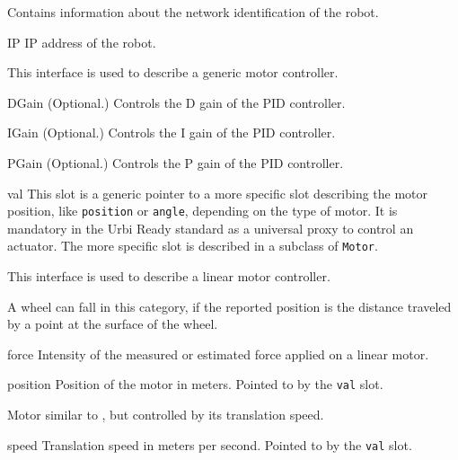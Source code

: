 
Contains information about the network identification of the robot.

\begin{urbiscriptapi}
\item[IP] IP address of the robot.
\end{urbiscriptapi}


This interface is used to describe a generic motor controller.

\begin{urbiscriptapi}
\item[DGain]{} (Optional.) Controls the D gain of the PID controller.


\item[IGain]{} (Optional.) Controls the I gain of the PID controller.


\item[PGain]{} (Optional.) Controls the P gain of the PID controller.


\item[val] This slot is a generic pointer to a more specific slot describing
  the motor position, like \lstinline{position} or \lstinline{angle},
  depending on the type of motor. It is mandatory in the Urbi Ready standard
  as a universal proxy to control an actuator. The more specific slot is
  described in a subclass of \lstinline{Motor}.
\end{urbiscriptapi}


This interface is used to describe a linear motor controller.

A wheel can fall in this category, if the reported position is the distance
traveled by a point at the surface of the wheel.

\begin{urbiscriptapi}
\item[force] Intensity of the measured or estimated force applied on a
  linear motor.


\item[position] Position of the motor in meters.  Pointed to by the
  \lstinline{val} slot.
\end{urbiscriptapi}


Motor similar to , but controlled by its translation
speed.

\begin{urbiscriptapi}
\item[speed] Translation speed in meters per second. Pointed to by the
  \lstinline{val} slot.
\end{urbiscriptapi}


